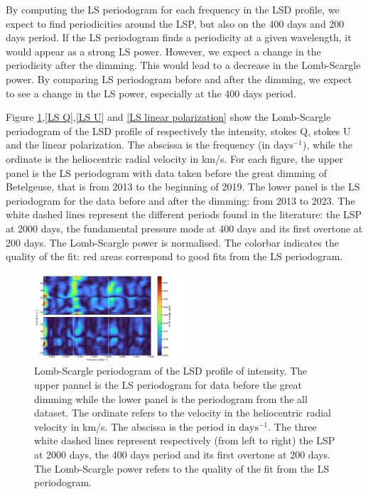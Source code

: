 \documentclass{aa}
\begin{document}
By computing the LS periodogram for each frequency 
in the LSD profile, we expect to find periodicities around the LSP, but also on the 400 days and 200 days period. If the LS periodogram finds a periodicity at a
given wavelength, it would appear as a strong LS power. However, we expect a change in the periodicity after the dimming. 
This would lead to a decrease in the Lomb-Scargle power. By comparing LS periodogram before and after the dimming, we expect to see a change in the LS power,
especially at the 400 days period. 

Figure \ref{LS intensity},\ref{LS Q},\ref{LS U} and \ref{LS linear polarization} show the Lomb-Scargle periodogram of the LSD profile of respectively 
the intensity, stokes Q, stokes U and the linear polarization. The abscissa is the frequency (in $\mathrm{days^{-1}}$), while the ordinate is the heliocentric radial velocity in km/s. 
For each figure, the upper panel is the LS periodogram with data taken before the great dimming of Betelgeuse, that is from 2013 to the beginning of 2019. 
The lower panel is the LS periodogram for the data before and after the dimming: from 2013 to 2023. The white dashed lines represent the different 
periods found in the literature: the LSP at 2000 days, the fundamental pressure mode at 400 days and its first overtone at 200 days. The Lomb-Scargle 
power is normalised. The colorbar indicates the quality of the fit: red areas correspond to good fits from the LS periodogram.

\begin{figure}[!h]
    \centering
    \includegraphics[width=0.5\textwidth]{Lomb-Scargle Intensity.png}
    \caption{Lomb-Scargle periodogram of the LSD profile of intensity. 
    The upper pannel is the LS periodogram for data before the great dimming while the lower panel is the periodogram from the all dataset.
    The ordinate refers to the velocity in the heliocentric radial velocity in km/s. The abscissa is the period in $\mathrm{days^{-1}}$. 
    The three white dashed lines represent respectively (from left to right) the LSP at 2000 days, the 400 days period and its first overtone at 200 days. 
    The Lomb-Scargle power refers to the quality of the fit from the LS periodogram. }
    \label{LS intensity}
\end{figure}
\end{document}
